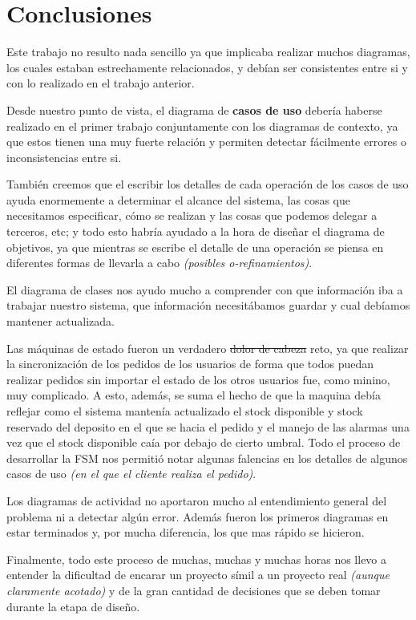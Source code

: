 \section{Conclusiones}

Este trabajo no resulto nada sencillo ya que implicaba realizar muchos diagramas, los cuales estaban estrechamente relacionados, y debían ser consistentes entre si y con lo realizado en el trabajo anterior.

Desde nuestro punto de vista, el diagrama de \textbf{casos de uso} debería haberse realizado en el primer trabajo conjuntamente con los diagramas de contexto, ya que estos tienen una muy fuerte relación y permiten detectar fácilmente errores o inconsistencias entre si. 

También creemos que el escribir los detalles de cada operación de los casos de uso ayuda enormemente a determinar el alcance del sistema, las cosas que necesitamos especificar, cómo se realizan y las cosas que podemos delegar a terceros, etc; y todo esto habría ayudado a la hora de diseñar el diagrama de objetivos, ya que mientras se escribe el detalle de una operación se piensa en diferentes formas de llevarla a cabo \textit{(posibles o-refinamientos)}.

El diagrama de clases nos ayudo mucho a comprender con que información iba a trabajar nuestro sistema, que información necesitábamos guardar y cual debíamos mantener actualizada.

Las máquinas de estado fueron un verdadero \sout{dolor de cabeza} reto, ya que realizar la sincronización de los pedidos de los usuarios de forma que todos puedan realizar pedidos sin importar el estado de los otros usuarios fue, como minino, muy complicado. A esto, además, se suma el hecho de que la maquina debía reflejar como el sistema mantenía actualizado el stock disponible y stock reservado del deposito en el que se hacia el pedido y el manejo de las alarmas una vez que el stock disponible caía por debajo de cierto umbral. Todo el proceso de desarrollar la FSM nos permitió notar algunas falencias en los detalles de algunos casos de uso \textit{(en el que el cliente realiza el pedido)}.

Los diagramas de actividad no aportaron mucho al entendimiento general del problema ni a detectar algún error. Además fueron los primeros diagramas en estar terminados y, por mucha diferencia, los que mas rápido se hicieron.

Finalmente, todo este proceso de muchas, muchas y muchas horas nos llevo a entender la dificultad de encarar un proyecto símil a un proyecto real \textit{(aunque claramente acotado)} y de la gran cantidad de decisiones que se deben tomar durante la etapa de diseño.

